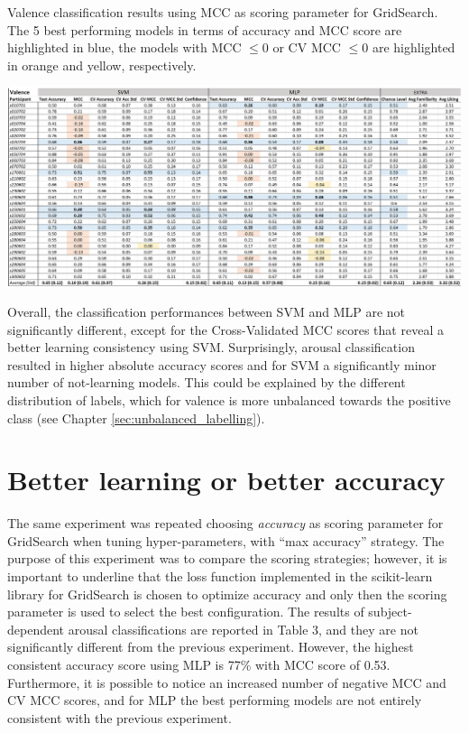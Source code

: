 \begin{table}[h!]
  \caption{Valence classification results using MCC as scoring parameter for GridSearch. The 5 best performing models in terms of accuracy and MCC score are highlighted in blue, the models with MCC \(\leq 0\) or CV MCC \(\leq 0\) are highlighted in orange and yellow, respectively.}
  \label{tbl:valence_results}
  \includegraphics[width=\linewidth]{img/results/valence_results.png}
\end{table}

Overall, the classification performances between \ac{SVM} and \ac{MLP} are not significantly different, except for the Cross-Validated MCC scores that reveal a better learning consistency using \ac{SVM}. Surprisingly, arousal classification resulted in higher absolute accuracy scores and for \ac{SVM} a significantly minor number of not-learning models. This could be explained by the different distribution of labels, which for valence is more unbalanced towards the positive class (see Chapter \ref{sec:unbalanced_labelling}).

\section{Better learning or better accuracy}
\label{sec:better_learning_accuracy}
The same experiment was repeated choosing \emph{accuracy} as scoring parameter for GridSearch when tuning hyper-parameters, with “max accuracy” strategy. The purpose of this experiment was to compare the scoring strategies; however, it is important to underline that the loss function implemented in the scikit-learn library for GridSearch is chosen to optimize accuracy and only then the scoring parameter is used to select the best configuration. The results of subject-dependent arousal classifications are reported in Table 3, and they are not significantly different from the previous experiment. However, the highest consistent accuracy score using \ac{MLP} is 77\% with \ac{MCC} score of 0.53. Furthermore, it is possible to notice an increased number of negative \ac{MCC} and \ac{CV MCC} scores, and for \ac{MLP} the best performing models are not entirely consistent with the previous experiment.

